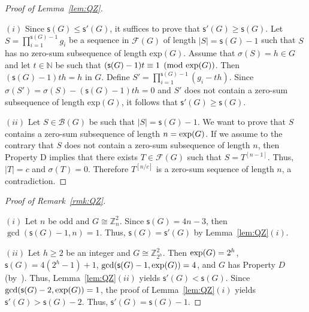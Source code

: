 \documentclass[12 pt]{amsart}
\def \n{\noindent }
\def \bs{\bigskip}
\def \F{\mathcal F}
\def \B{\mathcal B}
\def \Z{\mathbb Z}
\def \N{\mathbb N}
\def \Z{\mathbb Z}
\def \m{\mathsf{s}'}
\def \ls{\mathsf{s}}
\begin{document}
\begin{proof}[Proof of Lemma~\ref{lem:QZ}]\
	
\n $(i)$ Since $\ls(G)\leq \m(G)$, it suffices to prove that 
$\m(G)\geq\ls(G)$. 
Let $S=\prod_{i=1}^{\ls(G)-1}g_i$ be a sequence in $\F(G)$ of 
length $|S|=\ls(G)-1$ such that $S$ has no zero-sum subsequence of 
length exp$(G)$. Assume that $\sigma(S)=h\in G$ and let $t\in\N$ be such that $(\ls(G)-1)t\equiv 1\pmod{{\rm exp}(G)}$. Then $(\ls(G)-1)th=h$ in $G$. Define $S'=\prod_{i=1}^{\ls(G)-1}(g_i-th)$. Since $\sigma(S')=\sigma(S)-(\ls(G)-1)th=0$ and $S'$ does not 
contain a zero-sum subsequence of length exp$(G)$, it follows that $\m(G)\geq \ls(G)$.

\bs\n $(ii)$ Let $S\in \B(G)$ be such that $|S|=\ls(G)-1$. We want to prove that $S$ contains a zero-sum subsequence of length $n={\rm exp}(G)$. If we assume to the contrary that $S$ does not contain a zero-sum subsequence of length $n$, then Property D implies that there exists $T\in\F(G)$ such that $S=T^{[n-1]}$. Thus, $|T|=c$
and $\sigma(T)=0$. Therefore $T^{[n/c]}$ is a zero-sum sequence 
of length $n$, a contradiction.
\end{proof}
%
\begin{proof}[Proof of Remark~\ref{rmk:QZ}]\
	
\n $(i)$ Let $n$ be odd and $G\cong\Z^2_n$. Since $\ls(G)=4n-3$,
then $\gcd(\ls(G)-1,n)=1$. Thus, $\ls(G)=\m(G)$ by Lemma~\ref{lem:QZ}$(i)$.

\n $(ii)$ Let $h\geq2$ be an integer and $G\cong\Z^2_{2^h}$.
Then ${\rm exp}(G)=2^h$, $\ls(G)=4(2^h-1)+1$, $\gcd(\ls(G)-1,{\rm exp}(G))=4$, and $G$ has Property $D$ (by~\cite[Theorem~3.2]{GGS}). Thus, Lemma~\ref{lem:QZ}$(ii)$ yields $\m(G)<\ls(G)$.  Since  $\gcd(\ls(G)-2,{\rm exp}(G))=1$, the proof of Lemma~\ref{lem:QZ}$(i)$ yields $\m(G)>\ls(G)-2$. Thus,  $\m(G)=\ls(G)-1$.
\end{proof}
\end{document}
